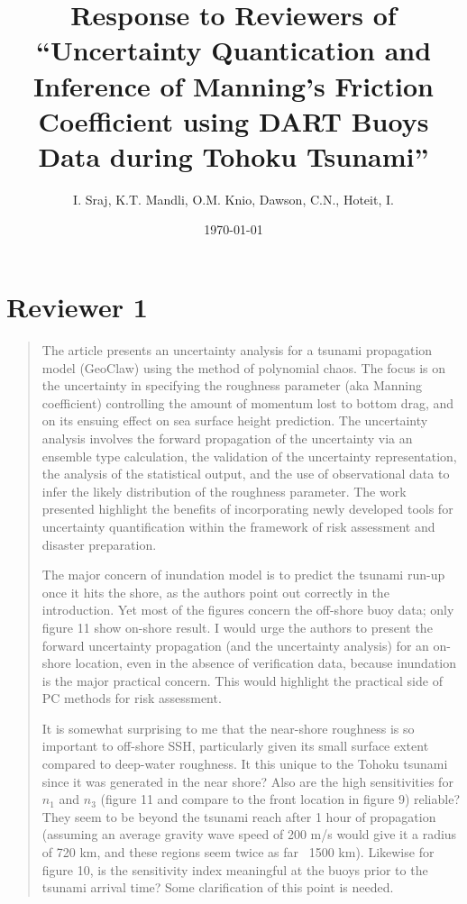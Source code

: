 \documentclass[]{article}
\title{Response to Reviewers of ``Uncertainty Quantication and Inference of Manning's Friction Coefficient using DART Buoys Data during Tohoku Tsunami''}
\author{I. Sraj, K.T. Mandli, O.M. Knio, Dawson, C.N., Hoteit, I.}
\date{\today}
\begin{document}
\ifpdf
{}
\else
{}
\fi


\section*{Reviewer 1}
\begin{quote}
The article presents an uncertainty analysis for a tsunami propagation model (GeoClaw) using the method of polynomial chaos. The focus is on the uncertainty in specifying the roughness parameter (aka Manning coefficient) controlling the amount of momentum lost to bottom drag, and on its ensuing effect on sea surface height prediction. The uncertainty analysis involves the forward propagation of the uncertainty via an ensemble type calculation, the validation of the uncertainty representation, the analysis of the statistical output, and the use of observational data to infer the likely distribution of the roughness parameter. The work presented highlight the benefits of incorporating newly developed tools for uncertainty quantification within the framework of risk assessment and disaster preparation.

The major concern of inundation model is to predict the tsunami run-up once it hits the shore, as the authors point out correctly in the introduction. Yet most of the figures concern the off-shore buoy data; only figure 11 show on-shore result. I would urge the authors to present the forward uncertainty propagation (and the uncertainty analysis) for an on-shore location, even in the absence of verification data, because inundation is the major practical concern. This would highlight the practical side of PC methods for risk assessment.

It is somewhat surprising to me that the near-shore roughness is so important to off-shore SSH, particularly given its small surface extent compared to deep-water roughness. It this unique to the Tohoku tsunami since it was generated in the near shore? Also are the high sensitivities for $n_1$ and $n_3$ (figure 11 and compare to the front location in figure 9) reliable? They seem to be beyond the tsunami reach after 1 hour of propagation (assuming an average gravity wave speed of 200 m/s would give it a radius of 720 km, and these regions seem twice as far ~1500 km). Likewise for figure 10, is the sensitivity index meaningful at the buoys prior to the tsunami arrival time? Some clarification of this point is needed.


\end{quote}
\end{document}
